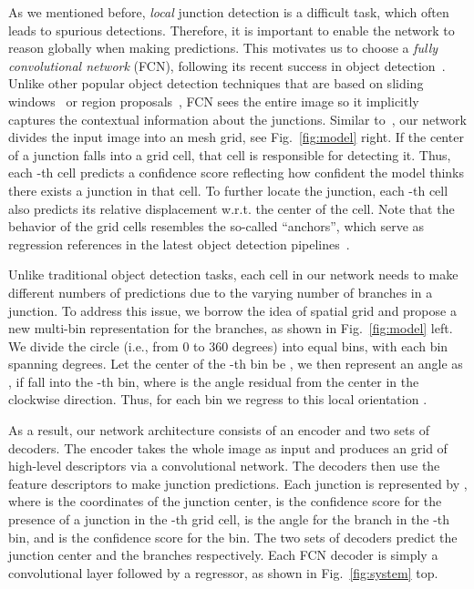 \documentclass[10pt,twocolumn,letterpaper]{article}
\begin{document}
 As we mentioned before, \emph{local} junction detection is a difficult task, which often leads to spurious detections. Therefore, it is important to enable the network to reason globally when making predictions. This motivates us to choose a \emph{fully convolutional network} (FCN), following its recent success in object detection~\cite{RedmonF16}. Unlike other popular object detection techniques that are based on sliding windows~\cite{SermanetEZMFL13} or region proposals~\cite{RenHGS15}, FCN sees the entire image so it implicitly captures the contextual information about the junctions. 
Similar to~\cite{RedmonDGF16, RedmonF16}, our network divides the input image into an  mesh grid, see Fig.~\ref{fig:model} right. If the center of a junction falls into a grid cell, that cell is responsible for detecting it. Thus, each -th cell predicts a confidence score  reflecting how confident the model thinks there exists a junction in that cell. To further locate the junction, each -th cell also predicts its relative displacement  w.r.t. the center of the cell. Note that the behavior of the grid cells resembles the so-called ``anchors'', which serve as regression references in the latest object detection pipelines~\cite{RenHGS15, RedmonDGF16, Liu2016SSD}.

 Unlike traditional object detection tasks, each cell in our network needs to make different numbers of predictions due to the varying number of branches in a junction. To address this issue, we borrow the idea of spatial grid and propose a new multi-bin representation for the branches, as shown in Fig.~\ref{fig:model} left. We divide the circle (i.e., from 0 to 360 degrees) into  equal bins, with each bin spanning  degrees. Let the center of the -th bin be , we then represent an angle  as , if  fall into the -th bin, where  is the angle residual from the center  in the clockwise direction. Thus, for each bin we regress to this local orientation .

As a result, our network architecture consists of an encoder and two sets of decoders. The encoder takes the whole image as input and produces an  grid of high-level descriptors via a convolutional network. The decoders then use the feature descriptors to make junction predictions.  
Each junction is represented by , where  is the coordinates of the junction center,  is the confidence score for the presence of a junction in the -th grid cell,  is the angle for the branch in the -th bin, and  is the confidence score for the bin. The two sets of decoders predict the junction center and the branches respectively. Each FCN decoder is simply a convolutional layer followed by a regressor, as shown in Fig.~\ref{fig:system} top.
\end{document}
